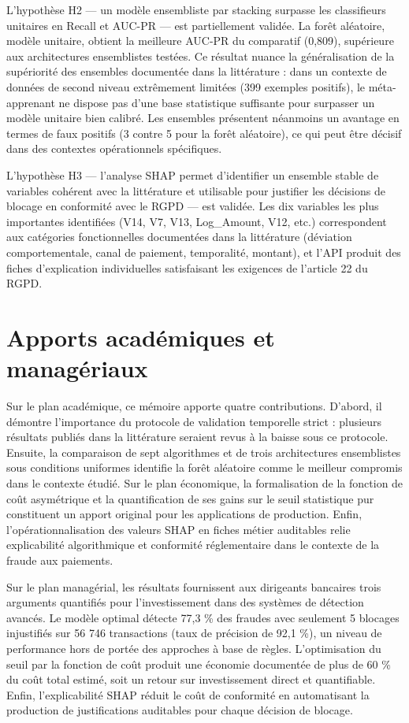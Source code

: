 L'hypothèse H2 — un modèle ensembliste par stacking surpasse les classifieurs unitaires en Recall et AUC-PR — est partiellement validée. La forêt aléatoire, modèle unitaire, obtient la meilleure AUC-PR du comparatif (0,809), supérieure aux architectures ensemblistes testées. Ce résultat nuance la généralisation de la supériorité des ensembles documentée dans la littérature : dans un contexte de données de second niveau extrêmement limitées (399 exemples positifs), le méta-apprenant ne dispose pas d'une base statistique suffisante pour surpasser un modèle unitaire bien calibré. Les ensembles présentent néanmoins un avantage en termes de faux positifs (3 contre 5 pour la forêt aléatoire), ce qui peut être décisif dans des contextes opérationnels spécifiques.

L'hypothèse H3 — l'analyse SHAP permet d'identifier un ensemble stable de variables cohérent avec la littérature et utilisable pour justifier les décisions de blocage en conformité avec le RGPD — est validée. Les dix variables les plus importantes identifiées (V14, V7, V13, Log\_Amount, V12, etc.) correspondent aux catégories fonctionnelles documentées dans la littérature (déviation comportementale, canal de paiement, temporalité, montant), et l'API produit des fiches d'explication individuelles satisfaisant les exigences de l'article 22 du RGPD.

\section{Apports académiques et managériaux}

Sur le plan académique, ce mémoire apporte quatre contributions. D'abord, il démontre l'importance du protocole de validation temporelle strict : plusieurs résultats publiés dans la littérature seraient revus à la baisse sous ce protocole. Ensuite, la comparaison de sept algorithmes et de trois architectures ensemblistes sous conditions uniformes identifie la forêt aléatoire comme le meilleur compromis dans le contexte étudié. Sur le plan économique, la formalisation de la fonction de coût asymétrique et la quantification de ses gains sur le seuil statistique pur constituent un apport original pour les applications de production. Enfin, l'opérationnalisation des valeurs SHAP en fiches métier auditables relie explicabilité algorithmique et conformité réglementaire dans le contexte de la fraude aux paiements.

Sur le plan managérial, les résultats fournissent aux dirigeants bancaires trois arguments quantifiés pour l'investissement dans des systèmes de détection avancés. Le modèle optimal détecte 77,3 \% des fraudes avec seulement 5 blocages injustifiés sur 56 746 transactions (taux de précision de 92,1 \%), un niveau de performance hors de portée des approches à base de règles. L'optimisation du seuil par la fonction de coût produit une économie documentée de plus de 60 \% du coût total estimé, soit un retour sur investissement direct et quantifiable. Enfin, l'explicabilité SHAP réduit le coût de conformité en automatisant la production de justifications auditables pour chaque décision de blocage.

